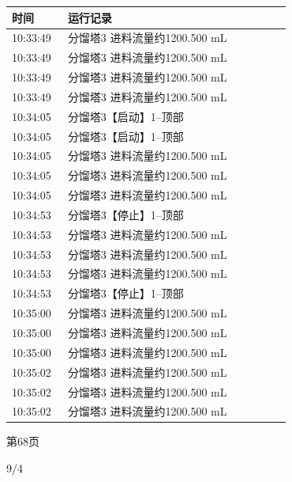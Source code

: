 \documentclass[UTF8,10pt,a4paper,fontset=fandol]{ctexart}
\newcommand{\handwritten}[1]{#1}
\begin{document}
\begin{center}
\begin{minipage}[t]{0.47\linewidth}
\smallskip
\begin{tabular}{|p{0.18\linewidth}|p{0.72\linewidth}|}
\hline
时间 & 运行记录 \\ \hline
10:33:49 & 分馏塔3 进料流量约1200.500 mL \\ \hline
10:33:49 & 分馏塔3 进料流量约1200.500 mL \\ \hline
10:33:49 & 分馏塔3 进料流量约1200.500 mL \\ \hline
10:33:49 & 分馏塔3 进料流量约1200.500 mL \\ \hline
10:34:05 & 分馏塔3【启动】1--顶部 \\ \hline
10:34:05 & 分馏塔3【启动】1--顶部 \\ \hline
10:34:05 & 分馏塔3 进料流量约1200.500 mL \\ \hline
10:34:05 & 分馏塔3 进料流量约1200.500 mL \\ \hline
10:34:05 & 分馏塔3 进料流量约1200.500 mL \\ \hline
10:34:53 & 分馏塔3【停止】1--顶部 \\ \hline
10:34:53 & 分馏塔3 进料流量约1200.500 mL \\ \hline
10:34:53 & 分馏塔3 进料流量约1200.500 mL \\ \hline
10:34:53 & 分馏塔3 进料流量约1200.500 mL \\ \hline
10:34:53 & 分馏塔3【停止】1--顶部 \\ \hline
10:35:00 & 分馏塔3 进料流量约1200.500 mL \\ \hline
10:35:00 & 分馏塔3 进料流量约1200.500 mL \\ \hline
10:35:00 & 分馏塔3 进料流量约1200.500 mL \\ \hline
10:35:02 & 分馏塔3 进料流量约1200.500 mL \\ \hline
10:35:02 & 分馏塔3 进料流量约1200.500 mL \\ \hline
10:35:02 & 分馏塔3 进料流量约1200.500 mL \\ \hline
\end{tabular}

\smallskip
第68页
\end{minipage}
\end{center}

\vspace{1em}

\handwritten{9/4}

\newpage
\end{document}
